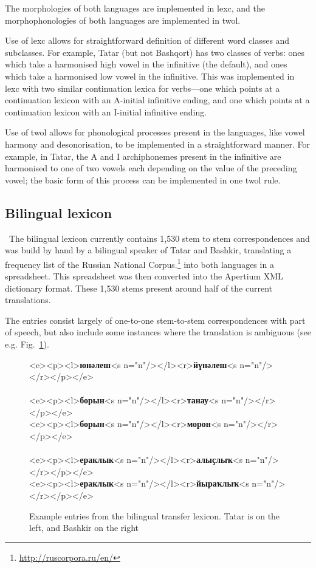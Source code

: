 \documentclass[11pt,a4paper]{article}
\begin{document}
The morphologies of both languages are implemented in lexc, and the morphophonologies of both languages are implemented in twol.

Use of lexc allows for straightforward definition of different word classes and subclasses.  For example, Tatar (but not Bashqort) has two classes of verbs: ones which take a harmonised high vowel in the infinitive (the default), and ones which take a harmonised low vowel in the infinitive.  This was implemented in lexc with two similar continuation lexica for verbs---one which points at a continuation lexicon with an A-initial infinitive ending, and one which points at a continuation lexicon with an I-initial infinitive ending.

Use of twol allows for phonological processes present in the languages, like vowel harmony and desonorisation, to be implemented in a straightforward manner.  For example, in Tatar, the A and I archiphonemes present in the infinitive are harmonised to one of two vowels each depending on the value of the preceding vowel; the basic form of this process can be implemented in one twol rule.

\subsection{Bilingual lexicon}
\
The bilingual lexicon currently contains 1,530 stem to stem correspondences and was build by hand by a bilingual 
speaker of Tatar and Bashkir, translating a frequency list of the Russian National Corpus.\footnote{\url{http://ruscorpora.ru/en/}}
into both languages in a spreadsheet. This spreadsheet was then converted into the Apertium
XML dictionary format. These 1,530 stems present around half of the current translations.

The entries consist largely of one-to-one stem-to-stem correspondences with part of speech, but also
include some instances where the translation is ambiguous (see e.g. Fig.~\ref{fig:bidix}).

\begin{figure}
\begin{center}
\begin{texttt}
    <e><p><l>\textbf{юнәлеш}<s n="n"/></l><r>\textbf{йүнәлеш}<s n="n"/></r></p></e> \\
~\\
    <e><p><l>\textbf{борын}<s n="n"/></l><r>\textbf{танау}<s n="n"/></r></p></e> \\
    <e><p><l>\textbf{борын}<s n="n"/></l><r>\textbf{морон}<s n="n"/></r></p></e> \\
~\\
    <e><p><l>\textbf{ераклык}<s n="n"/></l><r>\textbf{алыҫлыҡ}<s n="n"/></r></p></e> \\
    <e><p><l>\textbf{ераклык}<s n="n"/></l><r>\textbf{йыраҡлыҡ}<s n="n"/></r></p></e>

\end{texttt}
\end{center}
\caption{Example entries from the bilingual transfer lexicon. Tatar is on the left, and Bashkir on the right}
\label{fig:bidix}
\end{figure}
\end{document}
